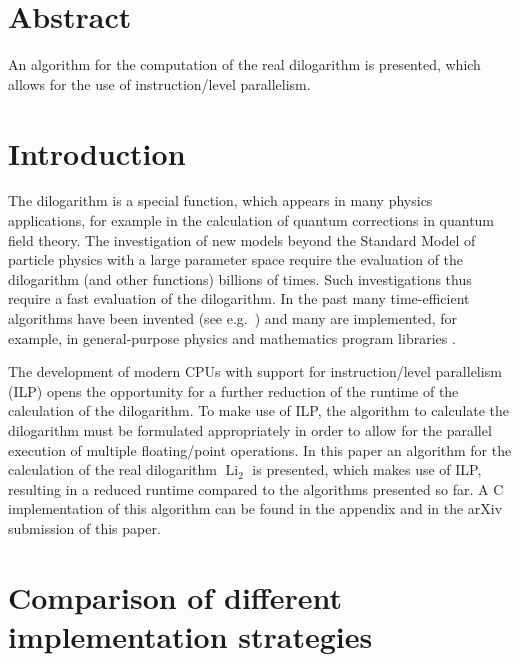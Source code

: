 \documentclass[10pt,DIV16,twocolumn,numbers=noenddot]{scrartcl}
\title{\mytitle}
\author{\myauthor}
\affil{Fachbereich Energie und Biotechnologie, Hochschule Flensburg,\\ Kanzleistra{\ss}e 91--93, 24943 Flensburg, Germany}
\date{\today}
\newcommand{\Li}{\operatorname{Li}_2}
\begin{document}
\maketitle

\section*{Abstract}

An algorithm for the computation of the real dilogarithm is presented,
which allows for the use of instruction\-/level parallelism.

\section{Introduction}

The dilogarithm \cite{lewin} is a special function, which appears in
many physics applications, for example in the calculation of quantum
corrections in quantum field theory.  The investigation of new models
beyond the Standard Model of particle physics with a large parameter
space require the evaluation of the dilogarithm (and other functions)
billions of times.  Such investigations thus require a fast evaluation
of the dilogarithm.  In the past many time-efficient algorithms have
been invented (see e.g.~\cite{koelbigDilog,ginsberg,morris}) and many
are implemented, for example, in general-purpose physics and
mathematics program libraries \cite{root,gsl,cephes}.

The development of modern CPUs with support for instruction\-/level
parallelism (ILP) opens the opportunity for a further reduction of the
runtime of the calculation of the dilogarithm.  To make use of ILP,
the algorithm to calculate the dilogarithm must be formulated
appropriately in order to allow for the parallel execution of multiple
floating\-/point operations.  In this paper an algorithm for the
calculation of the real dilogarithm $\Li$ is presented, which makes
use of ILP, resulting in a reduced runtime compared to the algorithms
presented so far.  A C implementation of this algorithm can be found
in the appendix and in the arXiv submission of this paper.

\section{Comparison of different implementation strategies}
\end{document}
